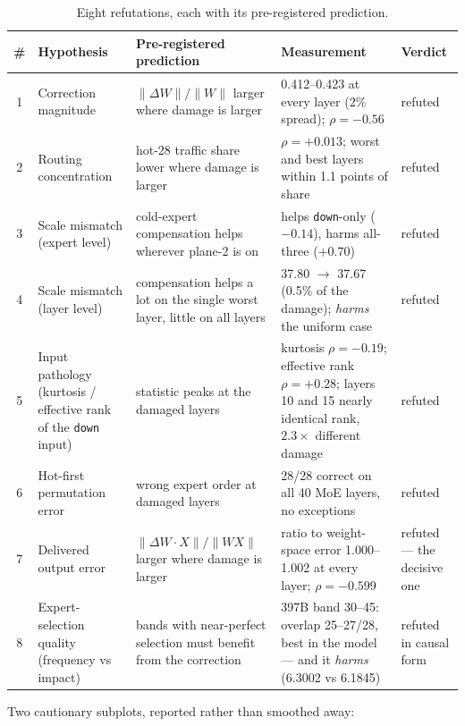 \documentclass[10pt]{article} %
\begin{document}
\begin{table}[t]
\centering
\small
\begin{tabular}{@{}c p{2.9cm} p{3.6cm} p{4.6cm} p{1.9cm}@{}}
\toprule
\# & Hypothesis & Pre-registered prediction & Measurement & Verdict \\
\midrule
1 & Correction magnitude & $\|\Delta W\|/\|W\|$ larger where damage is larger & 0.412--0.423 at every layer (2\% spread); $\rho = -0.56$ & refuted \\
2 & Routing concentration & hot-28 traffic share lower where damage is larger & $\rho = +0.013$; worst and best layers within 1.1 points of share & refuted \\
3 & Scale mismatch (expert level) & cold-expert compensation helps wherever plane-2 is on & helps \texttt{down}-only ($-0.14$), harms all-three ($+0.70$) & refuted \\
4 & Scale mismatch (layer level) & compensation helps a lot on the single worst layer, little on all layers & 37.80 $\to$ 37.67 (0.5\% of the damage); \emph{harms} the uniform case & refuted \\
5 & Input pathology (kurtosis / effective rank of the \texttt{down} input) & statistic peaks at the damaged layers & kurtosis $\rho = -0.19$; effective rank $\rho = +0.28$; layers 10 and 15 nearly identical rank, $2.3\times$ different damage & refuted \\
6 & Hot-first permutation error & wrong expert order at damaged layers & 28/28 correct on all 40 MoE layers, no exceptions & refuted \\
7 & Delivered output error & $\|\Delta W \cdot X\|/\|W X\|$ larger where damage is larger & ratio to weight-space error 1.000--1.002 at every layer; $\rho = -0.599$ & refuted --- the decisive one \\
8 & Expert-selection quality (frequency vs impact) & bands with near-perfect selection must benefit from the correction & 397B band 30--45: overlap 25--27/28, best in the model --- and it \emph{harms} (6.3002 vs 6.1845) & refuted in causal form \\
\bottomrule
\end{tabular}
\caption{Eight refutations, each with its pre-registered prediction.}
\label{tab:refutations}
\end{table}

Two cautionary subplots, reported rather than smoothed away:
\end{document}
